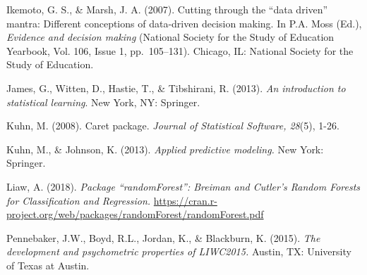 \documentclass[acmart]{apa6}
\theoremstyle{definition}
\theoremstyle{definition}
\theoremstyle{definition}
\theoremstyle{remark}
\begin{document}
Ikemoto, G. S., \& Marsh, J. A. (2007). Cutting through the
\enquote{data driven} mantra: Different conceptions of data-driven
decision making. In P.A. Moss (Ed.), \emph{Evidence and decision making}
(National Society for the Study of Education Yearbook, Vol. 106, Issue
1, pp.~105--131). Chicago, IL: National Society for the Study of
Education.

James, G., Witten, D., Hastie, T., \& Tibshirani, R. (2013). \emph{An
introduction to statistical learning}. New York, NY: Springer.

Kuhn, M. (2008). Caret package. \emph{Journal of Statistical Software,
28}(5), 1-26.

Kuhn, M., \& Johnson, K. (2013). \emph{Applied predictive modeling.} New
York: Springer.

Liaw, A. (2018). \emph{Package \enquote{randomForest}: Breiman and
Cutler's Random Forests for Classification and Regression.}
\url{https://cran.r-project.org/web/packages/randomForest/randomForest.pdf}

Pennebaker, J.W., Boyd, R.L., Jordan, K., \& Blackburn, K. (2015).
\emph{The development and psychometric properties of LIWC2015.} Austin,
TX: University of Texas at Austin.

\hypertarget{refs}{}

\endgroup
\end{document}
